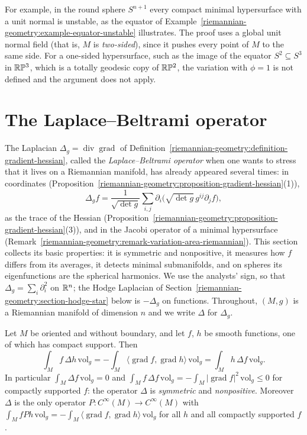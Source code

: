 For example, in the round sphere $S^{n+1}$ every compact minimal hypersurface with a unit normal is unstable, as the equator of
Example~\ref{riemannian-geometry:example-equator-unstable} illustrates. The proof uses a global unit normal field (that is, $M$ is \emph{two-sided}), since it pushes every point of $M$ to the same side. For a one-sided hypersurface, such as the
image of the equator $S^2 \subseteq S^3$ in $\mathbb{R}\mathbb{P}^3$, which is a totally geodesic copy of $\mathbb{R}\mathbb{P}^2$, the variation with $\phi = 1$ is not defined and the argument does not apply.

\section{The Laplace--Beltrami operator}\label{riemannian-geometry:section-laplace-beltrami}

The Laplacian $\Delta_g = \operatorname{div}\operatorname{grad}$ of Definition~\ref{riemannian-geometry:definition-gradient-hessian}, called the \emph{Laplace--Beltrami operator} when one wants to
stress that it lives on a Riemannian manifold, has already appeared several times: in coordinates (Proposition~\ref{riemannian-geometry:proposition-gradient-hessian}(1)),
\[
\Delta_gf = \frac{1}{\sqrt{\det g}}\sum_{i,j}\partial_i\bigl(\sqrt{\det g}\,g^{ij}\partial_jf\bigr),
\]
as the trace of the Hessian (Proposition~\ref{riemannian-geometry:proposition-gradient-hessian}(3)), and in the Jacobi operator of a minimal hypersurface
(Remark~\ref{riemannian-geometry:remark-variation-area-riemannian}). This section collects its basic properties: it is symmetric and nonpositive, it measures how $f$ differs from its
averages, it detects minimal submanifolds, and on spheres its eigenfunctions are the spherical harmonics. We use the analysts' sign, so that $\Delta_g = \sum_i\partial_i^2$ on
$\mathbb{R}^n$; the Hodge Laplacian of Section~\ref{riemannian-geometry:section-hodge-star} below is $-\Delta_g$ on functions. Throughout, $(M, g)$ is a Riemannian manifold of dimension $n$
and we write $\Delta$ for $\Delta_g$.

\begin{proposition}\label{riemannian-geometry:proposition-laplacian-symmetric}
Let $M$ be oriented and without boundary, and let $f$, $h$ be smooth functions, one of which has compact support. Then
\[
\int_Mf\,\Delta h\,\mathrm{vol}_g = -\int_M\langle\operatorname{grad}f, \operatorname{grad}h\rangle\,\mathrm{vol}_g = \int_Mh\,\Delta f\,\mathrm{vol}_g .
\]
In particular $\int_M\Delta f\,\mathrm{vol}_g = 0$ and $\int_Mf\,\Delta f\,\mathrm{vol}_g = -\int_M|\operatorname{grad}f|^2\,\mathrm{vol}_g \leq 0$ for compactly supported $f$: the operator $\Delta$ is
\emph{symmetric} and \emph{nonpositive}. Moreover $\Delta$ is the only operator $P \colon C^\infty(M) \to C^\infty(M)$ with $\int_MfPh\,\mathrm{vol}_g = -\int_M\langle\operatorname{grad}f, \operatorname{grad}h\rangle\,\mathrm{vol}_g$
for all $h$ and all compactly supported $f$.
\end{proposition}


